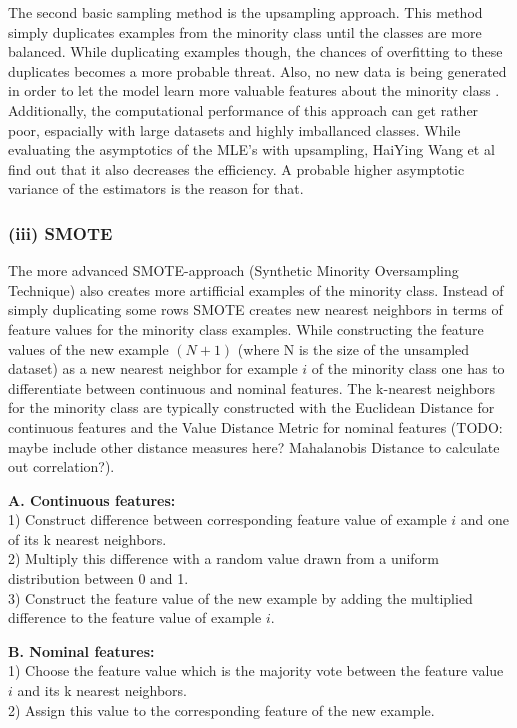 \documentclass[12pt,titlepage]{article}
\begin{document}
The second basic sampling method is the upsampling approach. This method simply duplicates examples from the minority class until the classes are more balanced. While duplicating examples though, the chances of overfitting to these duplicates becomes a more probable threat. Also, no new data is being generated in order to let the model learn more valuable features about the minority class \cite{mining_rarity}. Additionally, the computational performance of this approach can get rather poor, espacially with large datasets and highly imballanced classes. While evaluating the asymptotics of the MLE's with upsampling, HaiYing Wang et al find out that it also decreases the efficiency. A probable higher asymptotic variance of the estimators is the reason for that. \\

\subsubsection*{(iii) SMOTE}

The more advanced SMOTE-approach (Synthetic Minority Oversampling Technique) \cite{smote} also creates more artifficial examples of the minority class. Instead of simply duplicating some rows SMOTE creates new nearest neighbors in terms of feature values for the minority class examples. While constructing the feature values of the new example $(N + 1)$ (where N is the size of the unsampled dataset) as a new nearest neighbor for example $i$ of the
minority class one has to differentiate between continuous and nominal features. The k-nearest neighbors for the minority class are typically constructed with the Euclidean Distance for continuous features and the Value Distance Metric for nominal features (TODO: maybe include other distance measures here? Mahalanobis Distance to calculate out correlation?).
\vspace{3mm}

\textbf{A. Continuous features:} \\
1) Construct difference between corresponding feature value of example $i$ and one of its k nearest neighbors. \\
2) Multiply this difference with a random value drawn from a uniform distribution between 0 and 1. \\
3) Construct the feature value of the new example by adding the multiplied difference to the feature value of example $i$.
\vspace{3mm}

\textbf{B. Nominal features:} \\
1) Choose the feature value which is the majority vote between the feature value $i$ and its k nearest neighbors. \\
2) Assign this value to the corresponding feature of the new example. \vspace{3mm}
\end{document}

